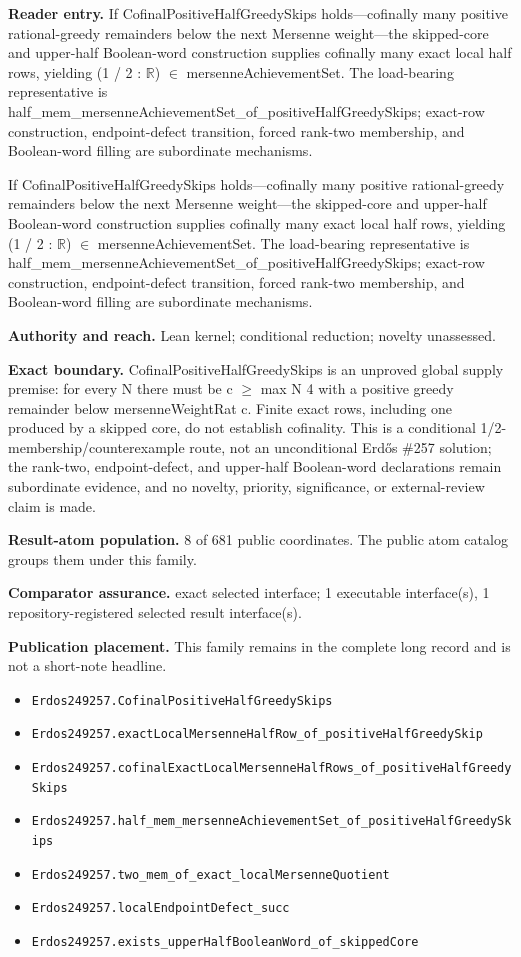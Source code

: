 \textbf{Reader entry.} If CofinalPositiveHalfGreedySkips holds—cofinally many positive rational-greedy remainders below the next Mersenne weight—the skipped-core and upper-half Boolean-word construction supplies cofinally many exact local half rows, yielding (1 / 2 : \ensuremath{\mathbb{R}}) \ensuremath{\in} mersenneAchievementSet. The load-bearing representative is half\_mem\_mersenneAchievementSet\_of\_positiveHalfGreedySkips; exact-row construction, endpoint-defect transition, forced rank-two membership, and Boolean-word filling are subordinate mechanisms.

If CofinalPositiveHalfGreedySkips holds—cofinally many positive rational-greedy remainders below the next Mersenne weight—the skipped-core and upper-half Boolean-word construction supplies cofinally many exact local half rows, yielding (1 / 2 : \ensuremath{\mathbb{R}}) \ensuremath{\in} mersenneAchievementSet. The load-bearing representative is half\_mem\_mersenneAchievementSet\_of\_positiveHalfGreedySkips; exact-row construction, endpoint-defect transition, forced rank-two membership, and Boolean-word filling are subordinate mechanisms.

\textbf{Authority and reach.} Lean kernel; conditional reduction; novelty unassessed.

\textbf{Exact boundary.} CofinalPositiveHalfGreedySkips is an unproved global supply premise: for every N there must be c \ensuremath{\ge} max N 4 with a positive greedy remainder below mersenneWeightRat c. Finite exact rows, including one produced by a skipped core, do not establish cofinality. This is a conditional 1/2-membership/counterexample route, not an unconditional Erdős \#257 solution; the rank-two, endpoint-defect, and upper-half Boolean-word declarations remain subordinate evidence, and no novelty, priority, significance, or external-review claim is made.

\textbf{Result-atom population.} 8 of 681 public coordinates. The public atom catalog groups them under this family.

\textbf{Comparator assurance.} exact selected interface; 1 executable interface(s), 1 repository-registered selected result interface(s).

\textbf{Publication placement.} This family remains in the complete long record and is not a short-note headline.

\begin{itemize}
  \item \nolinkurl{Erdos249257.CofinalPositiveHalfGreedySkips}
  \item \nolinkurl{Erdos249257.exactLocalMersenneHalfRow_of_positiveHalfGreedySkip}
  \item \nolinkurl{Erdos249257.cofinalExactLocalMersenneHalfRows_of_positiveHalfGreedySkips}
  \item \nolinkurl{Erdos249257.half_mem_mersenneAchievementSet_of_positiveHalfGreedySkips}
  \item \nolinkurl{Erdos249257.two_mem_of_exact_localMersenneQuotient}
  \item \nolinkurl{Erdos249257.localEndpointDefect_succ}
  \item \nolinkurl{Erdos249257.exists_upperHalfBooleanWord_of_skippedCore}
\end{itemize}

